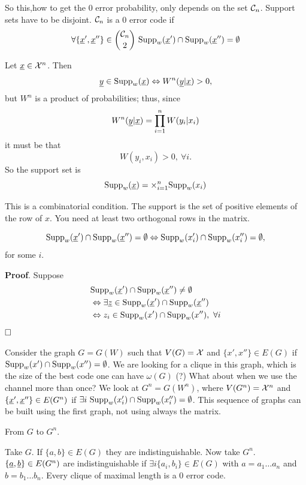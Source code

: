 So this,\ie how to get the 0 error probability, only depends on the set $\mathcal{C}_n$. Support sets have to be disjoint. $\mathcal{C}_n$ is a $0$ error code if
\[
\forall \{\underline{x}',\underline{x}'' \} \in \binom{\mathcal{C}_n}{2}\ \text{Supp}_w(\underline{x}') \cap \text{Supp}_w(\underline{x}'') = \emptyset
\]

\begin{obs}
	Let $\underline{x} \in \mathcal{X}^n$. Then $$\underline{y} \in \text{Supp}_w(\underline{x}) \Leftrightarrow W^n(\underline{y}|\underline{x}) >0,$$ but $W^n$ is a product of probabilities; thus, since
	$$W^n(\underline{y}|\underline{x}) = \prod_{i=1}^nW(y_i|x_i)$$
	it must be that
	$$W(y_i, x_i) > 0,\ \forall i.$$ So the support set is $$\text{Supp}_w(\underline{x}) = \times_{i=1}^n\text{Supp}_w(x_i)$$
\end{obs}

This is a combinatorial condition. The support is the set of positive elements of the row of $x$. You need at least two orthogonal rows in the matrix.

\begin{obs}
	$$\text{Supp}_w(\underline{x}') \cap \text{Supp}_w(\underline{x}'') = \emptyset \Leftrightarrow \text{Supp}_w(x_i') \cap \text{Supp}_w(x_i'') = \emptyset,$$ for some $i$. 
\end{obs}
\noindent\textbf{Proof}. Suppose 
\begin{align*}
	&\text{Supp}_w(\underline{x}') \cap \text{Supp}_w(\underline{x}'') \not= \emptyset\\
	&\Leftrightarrow \exists\underline{z} \in \text{Supp}_w(\underline{x}') \cap \text{Supp}_w(\underline{x}'')\\
	& \Leftrightarrow z_i \in \text{Supp}_w(x') \cap \text{Supp}_w(x''),\ \forall i
\end{align*}
$\hfill\Box$

Consider the graph $G = G(W)$ such that $V(G) = \mathcal{X}$ and $\{x',x'' \} \in E(G)$ if $\text{Supp}_w(x') \cap \text{Supp}_w(x'') = \emptyset$. We are looking for a clique in this graph, which is the size of the best code one can have $\omega(G)$ (?) What about when we use the channel more than once? We look at $G^n = G(W^n)$, where $V(G^n) = \mathcal{X}^n$ and $\{\underline{x}',\underline{x}''\} \in E(G^n)$ if $\exists i\ \text{Supp}_w(x_i') \cap \text{Supp}_w(x_i'') = \emptyset$. This sequence of graphs can be built using the first graph, not using always the matrix.

\noindent From $G$ to $G^n$.

\noindent Take $G$. If $\{a, b\} \in E(G)$ they are indistinguishable. Now take $G^n$. $\{\underline{a}, \underline{b}\} \in E(G^n)$ are indistinguishable if $\exists i \{a_i, b_i\} \in E(G)$ with $a = a_1\ldots a_n$ and $b=b_1\ldots b_n$. Every clique of maximal length is a 0 error code.

